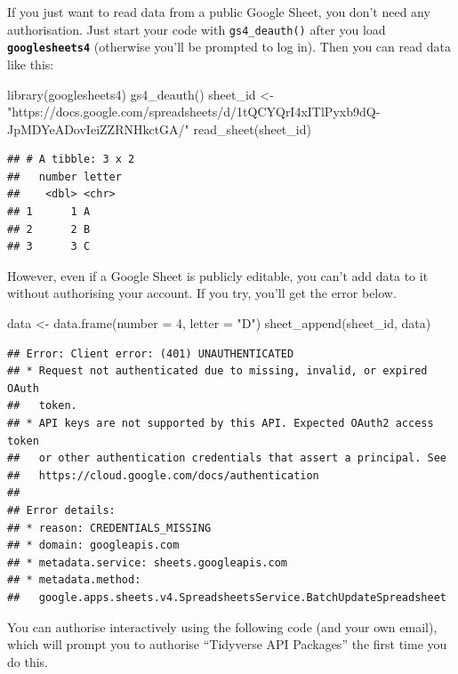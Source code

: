 \documentclass[
  oneside]{book}
\newenvironment{Shaded}{\begin{snugshade}}{\end{snugshade}}
\newcommand{\AttributeTok}[1]{\textcolor[rgb]{0.77,0.63,0.00}{#1}}
\newcommand{\DecValTok}[1]{\textcolor[rgb]{0.00,0.00,0.81}{#1}}
\newcommand{\FunctionTok}[1]{\textcolor[rgb]{0.00,0.00,0.00}{#1}}
\newcommand{\NormalTok}[1]{#1}
\newcommand{\OtherTok}[1]{\textcolor[rgb]{0.56,0.35,0.01}{#1}}
\newcommand{\StringTok}[1]{\textcolor[rgb]{0.31,0.60,0.02}{#1}}
\begin{document}
If you just want to read data from a public Google Sheet, you don't need any authorisation. Just start your code with \texttt{gs4\_deauth}\texttt{()} after you load \textbf{\texttt{googlesheets4}} (otherwise you'll be prompted to log in). Then you can read data like this:

\begin{Shaded}
\begin{Highlighting}[]
\FunctionTok{library}\NormalTok{(googlesheets4)}
\FunctionTok{gs4\_deauth}\NormalTok{()}
\NormalTok{sheet\_id }\OtherTok{\textless{}{-}} \StringTok{"https://docs.google.com/spreadsheets/d/1tQCYQrI4xITlPyxb9dQ{-}JpMDYeADovIeiZZRNHkctGA/"}
\FunctionTok{read\_sheet}\NormalTok{(sheet\_id)}
\end{Highlighting}
\end{Shaded}

\begin{verbatim}
## # A tibble: 3 x 2
##   number letter
##    <dbl> <chr> 
## 1      1 A     
## 2      2 B     
## 3      3 C
\end{verbatim}

However, even if a Google Sheet is publicly editable, you can't add data to it without authorising your account. If you try, you'll get the error below.

\begin{Shaded}
\begin{Highlighting}[]
\NormalTok{data }\OtherTok{\textless{}{-}} \FunctionTok{data.frame}\NormalTok{(}\AttributeTok{number =} \DecValTok{4}\NormalTok{, }\AttributeTok{letter =} \StringTok{"D"}\NormalTok{)}
\FunctionTok{sheet\_append}\NormalTok{(sheet\_id, data)}
\end{Highlighting}
\end{Shaded}

\begin{verbatim}
## Error: Client error: (401) UNAUTHENTICATED
## * Request not authenticated due to missing, invalid, or expired OAuth
##   token.
## * API keys are not supported by this API. Expected OAuth2 access token
##   or other authentication credentials that assert a principal. See
##   https://cloud.google.com/docs/authentication
## 
## Error details:
## * reason: CREDENTIALS_MISSING
## * domain: googleapis.com
## * metadata.service: sheets.googleapis.com
## * metadata.method:
##   google.apps.sheets.v4.SpreadsheetsService.BatchUpdateSpreadsheet
\end{verbatim}

You can authorise interactively using the following code (and your own email), which will prompt you to authorise ``Tidyverse API Packages'' the first time you do this.
\end{document}

